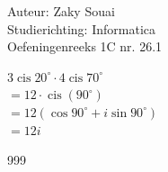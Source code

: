 \documentclass[a4paper]{article}
\begin{document}
  
\noindent \large Auteur: Zaky Souai \\
\noindent \large Studierichting: Informatica\\
\noindent \large Oefeningenreeks 1C nr. 26.1\\

\medskip

\normalsize

$ 3 \operatorname{cis} 20 ^{\circ} \cdot 4 \operatorname{cis} 70 ^{\circ}$ \\

$= 12 \cdot \operatorname{cis} (90 ^{\circ})$ \\

$= 12 (\cos 90 ^{\circ} + i \sin 90 ^{\circ})$ \\

$= 12i$ \\

\begin{thebibliography}{999}
\end{thebibliography}
\end{document}

